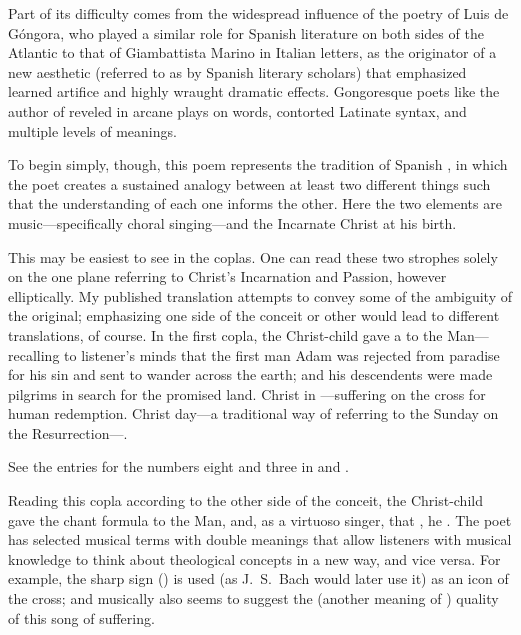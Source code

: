Part of its difficulty comes from the widespread influence of the poetry of Luis
de Góngora, who played a similar role for Spanish literature on both sides of
the Atlantic to that of Giambattista Marino in Italian letters, as the
originator of a new aesthetic (referred to as  by Spanish literary
scholars) that emphasized learned artifice and highly wraught dramatic effects.
Gongoresque poets like the author of  reveled in arcane plays
on words, contorted Latinate syntax, and multiple levels of meanings.%
    \Autocites
    [222--237]{Gaylord:Poetry}
    {Tenorio:Gongorismo}
    [vol.\ 1, 1014--1061]{Valbuena:Literatura}

To begin simply, though, this poem represents the tradition of Spanish
, in which the poet creates a sustained analogy between at
least two different things such that the understanding of each one informs the
other.
Here the two elements are music---specifically choral singing---and the
Incarnate Christ at his birth.

This may be easiest to see in the coplas.
One can read these two strophes solely on the one plane referring to Christ's
Incarnation and Passion, however elliptically.
My published translation attempts to convey some of the ambiguity of the
original; emphasizing one side of the conceit or other would lead to different
translations, of course.
In the first copla, the Christ-child gave a  to the
Man---recalling to listener's minds that the first man Adam was rejected from
paradise for his sin and sent to wander across the earth; and his descendents
were made pilgrims in search for the promised land.
Christ  in ---suffering on the cross for human redemption.
Christ  day---a traditional way of referring to the
Sunday on the Resurrection---.%
    \begin{Footnote}
        See the entries for the numbers eight and three in
        \autocite{Bongo:NumerorumMysteria} and
        \autocite{Ricciardo:CommentariaSymbolica}.
    \end{Footnote}

Reading this copla according to the other side of the conceit, the Christ-child
gave the  chant formula to the Man, and, as a virtuoso
singer,  that , he
.
The poet has selected musical terms with double meanings that allow listeners
with musical knowledge to think about theological concepts in a new way, and
vice versa.
For example, the sharp sign () is used (as J.\ S.\ Bach would
later use it) as an icon of the cross; and musically also seems to suggest the
 (another meaning of ) quality of this song
of suffering.



